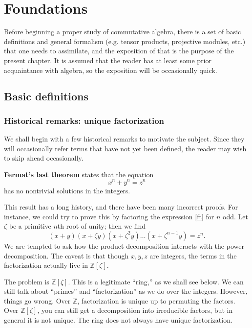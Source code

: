 \chapter{Foundations}

Before beginning a proper study of commutative algebra, there is a set of basic
definitions and general formalism (e.g. tensor products, projective modules,
etc.) that one needs to assimilate, and the exposition of that is the purpose
of the present chapter. It is assumed that the reader has at least some prior
acquaintance with algebra, so the exposition will be occasionally quick.

\section{Basic definitions}


\subsection{Historical remarks: unique factorization}

We shall begin with a few historical remarks to motivate the subject. Since
they will occasionally refer terms that have not yet been defined, the reader
may wish to skip ahead occasionally.

\textbf{Fermat's last theorem} states that the equation
  \[ \label{ft} x^n + y^n = z^n \]
has no nontrivial solutions in the integers.

This result has a long history, and there have been many incorrect proofs. For
instance, we could try to prove this by factoring the expression \eqref{ft} for
$n$ odd. Let $\zeta$ be a primitive $n$th root of unity; then we find
  \[ (x+y)(x+ \zeta y) (x+ \zeta^2y) \dots (x+ \zeta^{n-1}y) = z^n. \]
We are tempted to ask how the product decomposition interacts with the power
decomposition. The caveat is that though $x,y,z$ are integers, the terms in the
factorization actually live in $\mathbb{Z}[\zeta]$.

The problem is $\mathbb{Z}[\zeta]$. This is a legitimate ``ring,'' as we shall
see below. We can still talk about ``primes'' and ``factorization'' as we do
over the integers. However, things go wrong. Over $\mathbb{Z}$, factorization
is unique up to permuting the factors. Over $\mathbb{Z}[\zeta]$, you can still
get a decomposition into irreducible factors, but in general it is not unique.
The ring does not always have unique factorization.

